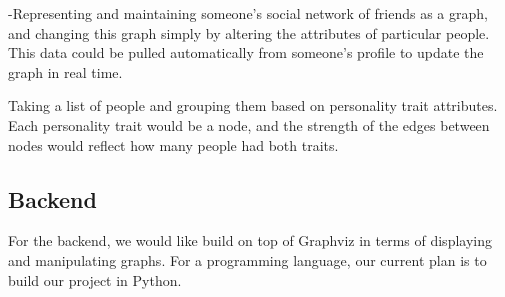 \documentclass{article}
\begin{document}
-Representing and maintaining someone's social network of friends as a graph, and changing this graph simply by altering the attributes of particular people. This data could be pulled automatically from someone’s profile to update the graph in real time.

Taking a list of people and grouping them based on personality trait attributes. Each personality trait would be a node, and the strength of the edges between nodes would reflect how many people had both traits.



\subsection*{Backend}

For the backend, we would like build on top of Graphviz in terms of displaying and manipulating graphs. 
For a programming language, our current plan is to build our project in Python. 
\end{document}
